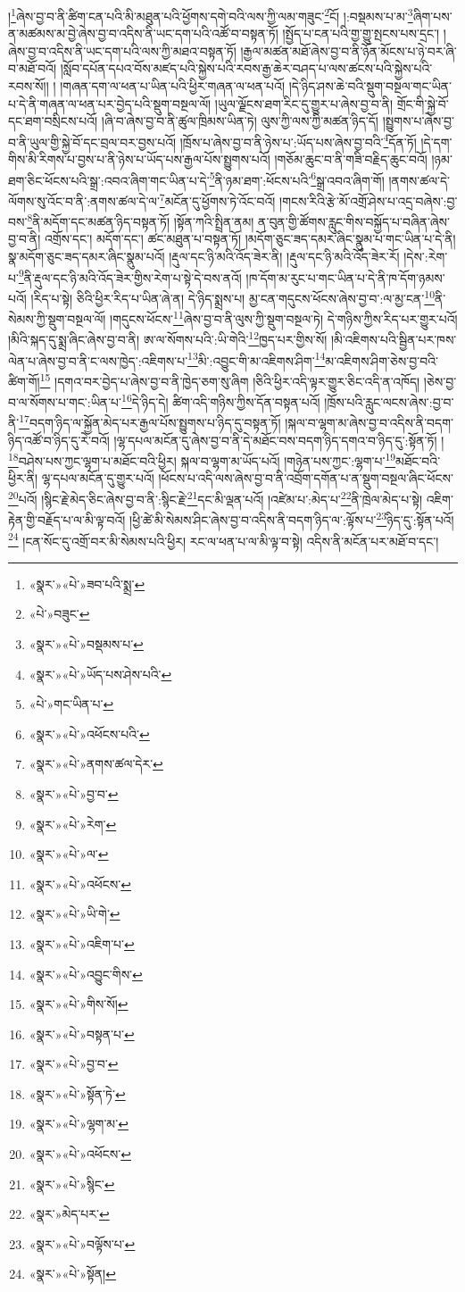 །\footnote{«སྣར་»«པེ་»ཟབ་པའི་སྨྲ་}ཞེས་བྱ་བ་ནི་ཚིག་ངན་པའི་མི་མཐུན་པའི་ཕྱོགས་དགེ་བའི་ལས་ཀྱི་ལམ་གཟུང་\footnote{«པེ་»བཟུང་}ངོ། །:བསྡམས་པ་མ་\footnote{«སྣར་»«པེ་»བསྡམས་པ་}ཞིག་པས་ན་མཚམས་མ་བྱེ་ཞེས་བྱ་བ་འདིས་ནི་ཡང་དག་པའི་འཚོ་བ་བསྟན་ཏོ། །སྤྱོད་པ་ངན་པའི་གྱ་གྱུ་སྤངས་པས་དྲང་། །ཞེས་བྱ་བ་འདིས་ནི་ཡང་དག་པའི་ལས་ཀྱི་མཐའ་བསྟན་ཏོ། །རྒྱལ་མཚན་མཐོ་ཞེས་བྱ་བ་ནི་ཉོན་མོངས་པ་ཉེ་བར་ཞི་བ་མཐོ་བའོ། །སློབ་དཔོན་དཔའ་བོས་མཛད་པའི་སྐྱེས་པའི་རབས་རྒྱ་ཆེར་བཤད་པ་ལས་ཚངས་པའི་སྐྱེས་པའི་རབས་སོ།། །
།གཞན་དག་ལ་ཕན་པ་ཡིན་པའི་ཕྱིར་གཞན་ལ་ཕན་པའོ། །དེ་ཉིད་ཤས་ཆེ་བའི་སྡུག་བསྔལ་གང་ཡིན་པ་དེ་ནི་གཞན་ལ་ཕན་པར་བྱེད་པའི་སྡུག་བསྔལ་ལོ། །ཡུལ་ལྗོངས་ཐག་རིང་དུ་གྱུར་པ་ཞེས་བྱ་བ་ནི། གྲོང་གི་སྐྱེ་བོ་དང་ཐག་བསྲིངས་པའོ། །ཞི་བ་ཞེས་བྱ་བ་ནི་ཚུལ་ཁྲིམས་ཡིན་ཏེ། ལུས་ཀྱི་ལས་ཀྱི་མཚན་ཉིད་དོ། །སྤྱུགས་པ་ཞེས་བྱ་བ་ནི་ཡུལ་གྱི་སྐྱེ་བོ་དང་བྲལ་བར་བྱས་པའོ། །ཁྲོས་པ་ཞེས་བྱ་བ་ནི་ཉེས་པ་:ཡོད་པས་ཞེས་བྱ་བའི་\footnote{«སྣར་»«པེ་»ཡོད་པས་ཤེས་པའི་}དོན་ཏོ། །དེ་དག་གིས་མི་རིགས་པ་བྱས་པ་ནི་ཉེས་པ་ཡོད་པས་རྒྱལ་པོས་སྤྱུགས་པའོ། །གཅོམ་ཆུང་བ་ནི་གཟི་བརྗིད་ཆུང་བའོ། །ཉམ་ཐག་ཅིང་ཕོངས་པའི་སྒྲ་:འབའ་ཞིག་གང་ཡིན་པ་དེ་\footnote{«པེ་»གང་ཡིན་པ་}ནི་ཉམ་ཐག་:ཕོངས་པའི་\footnote{«སྣར་»«པེ་»འཕོངས་པའི་}སྒྲ་འབའ་ཞིག་གོ། །ནགས་ཚལ་དེ་ལོགས་སུ་འོང་བ་ནི་:ནགས་ཚལ་དེ་ལ་\footnote{«སྣར་»«པེ་»ནགས་ཚལ་དེར་}མངོན་དུ་ཕྱོགས་ཏེ་འོང་བའོ། །གངས་རིའི་རྩེ་མོ་འགྲོ་ཤེས་པ་འདྲ་བཞེས་:བྱ་བས་\footnote{«སྣར་»«པེ་»བྱ་བ་}ནི་མདོག་དང་མཚན་ཉིད་བསྟན་ཏོ། །སྟོན་ཀའི་སྤྲིན་ནམ། ན་བུན་གྱི་ཚོགས་རླུང་གིས་བསྐྱོད་པ་བཞིན་ཞེས་བྱ་བ་ནི། འགྲོས་དང་། མདོག་དང་། ཚང་མཐུན་པ་བསྟན་ཏོ། །མདོག་ཅུང་ཟད་དམར་ཞིང་སྣུམ་པ་གང་ཡིན་པ་དེ་ནི། སྣ་མདོག་ཅུང་ཟད་དམར་ཞིང་སྣུམ་པའོ། །རྡུལ་དང་ཉི་མའི་འོད་ཟེར་ནི། །རྡུལ་དང་ཉི་མའི་འོད་ཟེར་རོ། །དེས་:རེག་པ་\footnote{«སྣར་»«པེ་»རེག་}ནི་རྡུལ་དང་ཉི་མའི་འོད་ཟེར་གྱིས་རེག་པ་སྟེ་དེ་བས་ནའོ། །ཁ་དོག་མ་རུང་པ་གང་ཡིན་པ་དེ་ནི་ཁ་དོག་ཉམས་པའོ། །རིད་པ་སྟེ། ཅིའི་ཕྱིར་རིད་པ་ཡིན་ཞེ་ན། དེ་ཉིད་སྨྲས་པ། མྱ་ངན་གདུངས་ཕོངས་ཞེས་བྱ་བ་:ལ་མྱ་ངན་\footnote{«སྣར་»«པེ་»ལ་}ནི་སེམས་ཀྱི་སྡུག་བསྔལ་ལོ། །གདུངས་ཕོངས་\footnote{«སྣར་»«པེ་»འཕོངས་}ཞེས་བྱ་བ་ནི་ལུས་ཀྱི་སྡུག་བསྔལ་ཏེ། དེ་གཉིས་ཀྱིས་རིད་པར་གྱུར་པའོ། །མིའི་སྐད་དུ་སྨྲ་ཞིང་ཞེས་བྱ་བ་ནི། ཨ་ལ་སོགས་པའི་:ཡི་གེའི་\footnote{«སྣར་»«པེ་»ཡི་གེ་}ཁྱད་པར་གྱིས་སོ། །མི་འཇིགས་པའི་སྦྱིན་པར་ཁས་ལེན་པ་ཞེས་བྱ་བ་ནི་ང་ལས་ཁྱེད་:འཇིགས་པ་\footnote{«སྣར་»«པེ་»འཇིག་པ་}མི་:འབྱུང་གི་མ་འཇིགས་ཤིག་\footnote{«སྣར་»«པེ་»འབྱུང་གིས་}མ་འཇིགས་ཤིག་ཅེས་བྱ་བའི་ཚིག་གོ།\footnote{«སྣར་»«པེ་»གིས་སོ།} །དགའ་བར་བྱེད་པ་ཞེས་བྱ་བ་ནི་ཁྱེད་ཅག་སུ་ཞིག །ཅིའི་ཕྱིར་འདི་ལྟར་གྱུར་ཅིང་འདི་ན་འཁོད། །ཅེས་བྱ་བ་ལ་སོགས་པ་གང་:ཡིན་པ་\footnote{«སྣར་»«པེ་»བསྟན་པ་}དེ་ཉིད་དེ། ཚིག་འདི་གཉིས་ཀྱིས་དོན་བསྟན་པའོ། །ཁྲོས་པའི་རླུང་ལངས་ཞེས་:བྱ་བ་ནི་\footnote{«སྣར་»«པེ་»བྱ་བ་}བདག་ཉིད་ལ་སྐྱོན་མེད་པར་རྒྱལ་པོས་སྤྱུགས་པ་ཉིད་དུ་བསྟན་ཏོ། །སྐལ་བ་ལྷག་མ་ཞེས་བྱ་བ་འདིས་ནི་བདག་ཉིད་འཚོ་བ་ཉིད་དུ་རེ་བའོ། །ལྷ་དཔལ་མངོན་དུ་ཞེས་བྱ་བ་ནི་དེ་མཐོང་བས་བདག་ཉིད་དགའ་བ་ཉིད་དུ་:སྟོན་ཏོ། །\footnote{«སྣར་»«པེ་»སྟོན་ཏེ་}བཤེས་པས་ཀྱང་ལྷག་པ་མཐོང་བའི་ཕྱིར། སྐལ་བ་ལྷག་མ་ཡོད་པའོ། །གཉེན་པས་ཀྱང་:ལྷག་པ་\footnote{«སྣར་»«པེ་»ལྷག་མ་}མཐོང་བའི་ཕྱིར་ནི། ལྷ་དཔལ་མངོན་དུ་གྱུར་པའོ། །ཕོངས་པ་འདི་ལས་ཞེས་བྱ་བ་ནི་འབྲོག་དགོན་པ་ན་སྡུག་བསྔལ་ཞིང་ཕོངས་\footnote{«སྣར་»«པེ་»འཕོངས་}པའོ། །སྙིང་རྗེ་མེད་ཅིང་ཞེས་བྱ་བ་ནི་:སྙིང་རྗེ་\footnote{«སྣར་»«པེ་»སྙིང་}དང་མི་ལྡན་པའོ། །འཛེམ་པ་:མེད་པ་\footnote{«སྣར་»མེད་པར་}ནི་ཁྲེལ་མེད་པ་སྟེ། འཇིག་རྟེན་གྱི་བརྗོད་པ་ལ་མི་ལྟ་བའོ། །ཕྱི་ཚེ་མི་སེམས་ཤིང་ཞེས་བྱ་བ་འདིས་ནི་བདག་ཉིད་ལ་:ལྟོས་པ་\footnote{«སྣར་»«པེ་»བལྟོས་པ་}ཉིད་དུ་:སྟོན་པའོ།\footnote{«སྣར་»«པེ་»སྟོན།} །ངན་སོང་དུ་འགྲོ་བར་མི་སེམས་པའི་ཕྱིར། རང་ལ་ཕན་པ་ལ་མི་ལྟ་བ་སྟེ། འདིས་ནི་མངོན་པར་མཐོ་བ་དང་། 